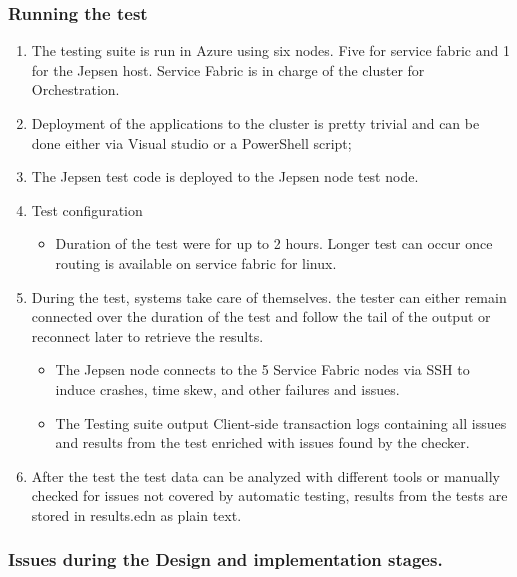 \documentclass[a4paper,10pt,titlepage]{report}
\begin{document}
\subsubsection{Running the test}

\begin{enumerate}
    \item The testing suite is run in Azure using six nodes. Five for service fabric and 1 for the Jepsen host.  Service Fabric is in charge of the cluster for Orchestration.
    \item Deployment of the applications to the cluster is pretty trivial and can be done either via Visual studio or a PowerShell script; 
    \item The Jepsen test code is deployed to the Jepsen node test node. 
    \item Test configuration
    \begin{itemize}
        \item Duration of the test were for up to 2 hours. Longer test can occur once routing is available on service fabric for linux.
    \end{itemize}
    \item During the test, systems take care of themselves. the tester can either remain connected over the duration of the test and follow the tail of the output or reconnect later to retrieve the results.
    \begin{itemize}
        \item  The Jepsen node connects to the 5 Service Fabric nodes via SSH to induce crashes, time skew, and other failures and issues.
        \item The Testing suite output Client-side transaction logs containing all issues and results from the test enriched with issues found by the checker.
    \end{itemize}
    \item After the test the test data can be analyzed with different tools or manually checked for issues not covered by automatic testing, results from the tests are stored in results.edn as plain text.
\end{enumerate}
 
\subsubsection{Issues during the Design and implementation stages.}
\end{document}
